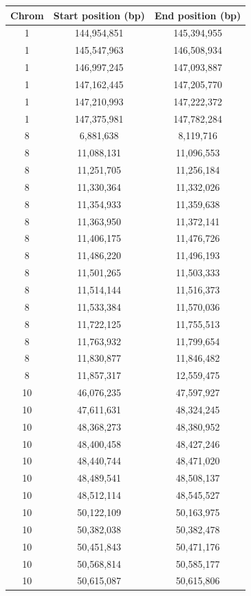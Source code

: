 \begin{table}[!h] \centering
    \small
    \begin{tabular}{|ccc|}
\hline Chrom & Start position (bp) & End position (bp) \\ \hline
1 & 144,954,851 & 145,394,955 \\
1 & 145,547,963 & 146,508,934 \\
1 & 146,997,245 & 147,093,887 \\
1 & 147,162,445 & 147,205,770 \\
1 & 147,210,993 & 147,222,372 \\
1 & 147,375,981 & 147,782,284 \\
8 & 6,881,638 & 8,119,716 \\
8 & 11,088,131 & 11,096,553 \\
8 & 11,251,705 & 11,256,184 \\
8 & 11,330,364 & 11,332,026 \\
8 & 11,354,933 & 11,359,638 \\
8 & 11,363,950 & 11,372,141 \\
8 & 11,406,175 & 11,476,726 \\
8 & 11,486,220 & 11,496,193 \\
8 & 11,501,265 & 11,503,333 \\
8 & 11,514,144 & 11,516,373 \\
8 & 11,533,384 & 11,570,036 \\
8 & 11,722,125 & 11,755,513 \\
8 & 11,763,932 & 11,799,654 \\
8 & 11,830,877 & 11,846,482 \\
8 & 11,857,317 & 12,559,475 \\
10 & 46,076,235 & 47,597,927 \\
10 & 47,611,631 & 48,324,245 \\
10 & 48,368,273 & 48,380,952 \\
10 & 48,400,458 & 48,427,246 \\
10 & 48,440,744 & 48,471,020 \\
10 & 48,489,541 & 48,508,137 \\
10 & 48,512,114 & 48,545,527 \\
10 & 50,122,109 & 50,163,975 \\
10 & 50,382,038 & 50,382,478 \\
10 & 50,451,843 & 50,471,176 \\
10 & 50,568,814 & 50,585,177 \\
10 & 50,615,087 & 50,615,806 \\

\end{tabular}
\end{table}
